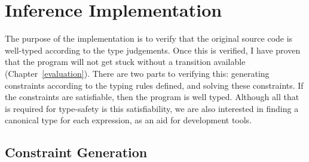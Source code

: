 \documentclass[12pt,a4paper,twoside,openright]{report}
\theoremstyle{definition}
\theoremstyle{dotless}
\begin{document}
\section{Inference Implementation}

The purpose of the implementation is to verify that the original source code is
well-typed according to the type judgements. Once this is verified, I have
proven that the program will not get stuck without a transition available (Chapter~\ref{evaluation}).
There are two parts to verifying this: generating constraints according to the
typing rules defined, and solving these constraints. If the constraints are
satisfiable, then the program is well typed. Although all that is required for
type-safety is this satisfiability, we are also interested in finding a
canonical type for each expression, as an aid for development tools.

\subsection{Constraint Generation}
\end{document}

